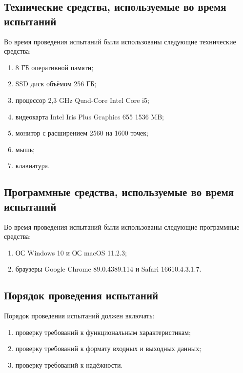 \documentclass{../../includes/TechDocMultiAuthors}
\begin{document}
    \subsection{Технические средства, используемые во время испытаний}

    Во время проведения испытаний были использованы следующие технические средства:

    \begin{enumerate}
        \item 8 ГБ оперативной памяти;
        \item SSD диск объёмом 256 ГБ;
        \item процессор 2,3 GHz Quad-Core Intel Core i5;
        \item видеокарта Intel Iris Plus Graphics 655 1536 MB;
        \item монитор с расширением 2560 на 1600 точек;
        \item мышь;
        \item клавиатура.
    \end{enumerate}

    \subsection{Программные средства, используемые во время испытаний}

    Во время проведения испытаний были использованы следующие программные средства:
    
    \begin{enumerate}
        \item ОС Windows 10 и ОС macOS 11.2.3;
        \item браузеры Google Chrome 89.0.4389.114 и Safari 16610.4.3.1.7.
    \end{enumerate}

    \subsection{Порядок проведения испытаний}

    Порядок проведения испытаний должен включать:

    \begin{enumerate}
        \item проверку требований к функциональным характеристикам;
        \item проверку требований к формату входных и выходных данных;
        \item проверку требований к надёжности.
    \end{enumerate}
\end{document}
